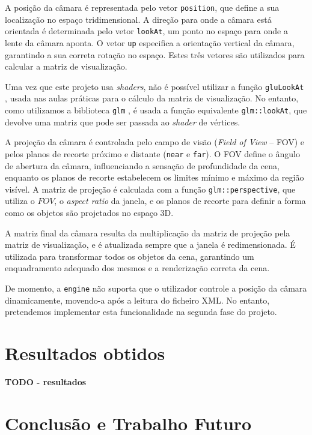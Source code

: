 \documentclass[12pt, a4paper]{article}
\begin{document}
A posição da câmara é representada pelo vetor \texttt{position}, que define a sua localização no
espaço tridimensional. A direção para onde a câmara está orientada é determinada pelo vetor
\texttt{lookAt}, um ponto no espaço para onde a lente da câmara aponta. O vetor \texttt{up}
especifica a orientação vertical da câmara, garantindo a sua correta rotação no espaço. Estes três
vetores são utilizados para calcular a matriz de visualização.

Uma vez que este projeto usa \emph{shaders}, não é possível utilizar a função \texttt{gluLookAt}
\cite{gluLookAt}, usada nas aulas práticas para o cálculo da matriz de visualização. No entanto,
como utilizamos a biblioteca \texttt{glm} \cite{glm}, é usada a função equivalente
\texttt{glm::lookAt}, que devolve uma matriz que pode ser passada ao \emph{shader} de vértices.

A projeção da câmara é controlada pelo campo de visão (\emph{Field of View} -- FOV) e pelos planos
de recorte próximo e distante (\texttt{near} e \texttt{far}). O FOV define o ângulo de abertura da
câmara, influenciando a sensação de profundidade da cena, enquanto os planos de recorte estabelecem
os limites mínimo e máximo da região visível. A matriz de projeção é calculada com a função
\texttt{glm::perspective}, que utiliza o $FOV$, o \emph{aspect ratio} da janela, e os planos de
recorte para definir a forma como os objetos são projetados no espaço 3D.

A matriz final da câmara resulta da multiplicação da matriz de projeção pela matriz de visualização,
e é atualizada sempre que a janela é redimensionada. É utilizada para transformar todos os objetos
da cena, garantindo um enquadramento adequado dos mesmos e a renderização correta da cena.

De momento, a \texttt{engine} não suporta que o utilizador controle a posição da câmara
dinamicamente, movendo-a após a leitura do ficheiro XML. No entanto, pretendemos implementar esta
funcionalidade na segunda fase do projeto.

\section{Resultados obtidos}

\textbf{\color{red} TODO - resultados}

\section{Conclusão e Trabalho Futuro}
\end{document}
